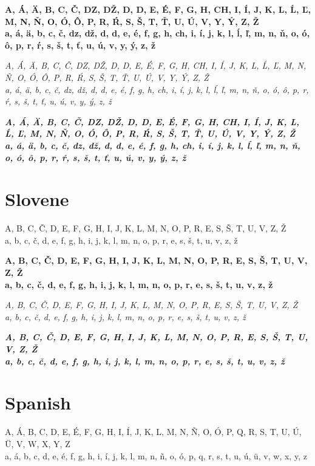 \documentclass[12pt]{article}
\begin{document}
\textbf{
A, Á, Ä, B, C, Č, DZ, DŽ, D, D, E, É, F, G, H, CH, I, Í, J, K, L, Ĺ, Ľ, M, N, Ň, O, Ó, Ô, P, R, Ŕ, S, Š, T, Ť, U, Ú, V, Y, Ý, Z, Ž \\
a, á, ä, b, c, č, dz, dž, d, d, e, é, f, g, h, ch, i, í, j, k, l, ĺ, ľ, m, n, ň, o, ó, ô, p, r, ŕ, s, š, t, ť, u, ú, v, y, ý, z, ž
}

\textit{
A, Á, Ä, B, C, Č, DZ, DŽ, D, D, E, É, F, G, H, CH, I, Í, J, K, L, Ĺ, Ľ, M, N, Ň, O, Ó, Ô, P, R, Ŕ, S, Š, T, Ť, U, Ú, V, Y, Ý, Z, Ž \\
a, á, ä, b, c, č, dz, dž, d, d, e, é, f, g, h, ch, i, í, j, k, l, ĺ, ľ, m, n, ň, o, ó, ô, p, r, ŕ, s, š, t, ť, u, ú, v, y, ý, z, ž
}

\textbf{\textit{
A, Á, Ä, B, C, Č, DZ, DŽ, D, D, E, É, F, G, H, CH, I, Í, J, K, L, Ĺ, Ľ, M, N, Ň, O, Ó, Ô, P, R, Ŕ, S, Š, T, Ť, U, Ú, V, Y, Ý, Z, Ž \\
a, á, ä, b, c, č, dz, dž, d, d, e, é, f, g, h, ch, i, í, j, k, l, ĺ, ľ, m, n, ň, o, ó, ô, p, r, ŕ, s, š, t, ť, u, ú, v, y, ý, z, ž
}}


\clearpage
\section{Slovene}
A, B, C, Č, D, E, F, G, H, I, J, K, L, M, N, O, P, R, E, S, Š, T, U, V, Z, Ž \\
a, b, c, č, d, e, f, g, h, i, j, k, l, m, n, o, p, r, e, s, š, t, u, v, z, ž

\textbf{
A, B, C, Č, D, E, F, G, H, I, J, K, L, M, N, O, P, R, E, S, Š, T, U, V, Z, Ž \\
a, b, c, č, d, e, f, g, h, i, j, k, l, m, n, o, p, r, e, s, š, t, u, v, z, ž
}

\textit{
A, B, C, Č, D, E, F, G, H, I, J, K, L, M, N, O, P, R, E, S, Š, T, U, V, Z, Ž \\
a, b, c, č, d, e, f, g, h, i, j, k, l, m, n, o, p, r, e, s, š, t, u, v, z, ž
}

\textbf{\textit{
A, B, C, Č, D, E, F, G, H, I, J, K, L, M, N, O, P, R, E, S, Š, T, U, V, Z, Ž \\
a, b, c, č, d, e, f, g, h, i, j, k, l, m, n, o, p, r, e, s, š, t, u, v, z, ž
}}


\section{Spanish}
A, Á, B, C, D, E, É, F, G, H, I, Í, J, K, L, M, N, Ñ, O, Ó, P, Q, R, S, T, U, Ú, Ü, V, W, X, Y, Z \\
a, á, b, c, d, e, é, f, g, h, i, í, j, k, l, m, n, ñ, o, ó, p, q, r, s, t, u, ú, ü, v, w, x, y, z
\end{document}
